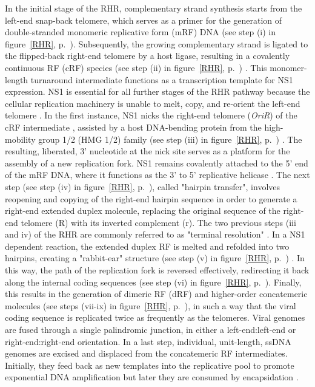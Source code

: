 In the initial stage of the RHR, complementary strand synthesis starts from the left-end snap-back telomere, which serves as a primer for the generation of double-stranded monomeric replicative form (mRF) DNA (see step (i) in figure~\ref{RHR}, p.~\pageref{RHR}). Subsequently, the growing complementary strand is ligated to the flipped-back right-end telomere by a host ligase, resulting in a covalently continuous RF (cRF) species (see step (ii) in figure~\ref{RHR}, p.~\pageref{RHR}) \cite{pmid2911112, pmid2543770}. This monomer-length turnaround intermediate functions as a transcription template for NS1 expression. NS1 is essential for all further stages of the RHR pathway because the cellular replication machinery is unable to melt, copy, and re-orient the left-end telomere \cite{pmid8995615}. In the first instance, NS1 nicks the right-end telomere (\textit{OriR}) of the cRF intermediate \cite{pmid9349487}, assisted by a host DNA-bending protein from the high-mobility group 1/2 (HMG 1/2) family (see step (iii) in figure~\ref{RHR}, p.~\pageref{RHR}) \cite{pmid9765384}. The resulting, liberated, 3' nucleotide at the nick site serves as a platform for the assembly of a new replication fork. NS1 remains covalently attached to the 5' end of the mRF DNA, where it functions as the 3' to 5' replicative helicase \cite{pmid12050365, pmid3339715, pmid3203742}. The next step (see step (iv) in figure~\ref{RHR}, p.~\pageref{RHR}), called "hairpin transfer", involves reopening and copying of the right-end hairpin sequence in order to generate a right-end extended duplex molecule, replacing the original sequence of the right-end telomere (R) with its inverted complement (r). The two previous steps (iii and iv) of the RHR are commonly referred to as "terminal resolution" \cite{telomere2}. In a NS1 dependent reaction, the extended duplex RF is melted and refolded into two hairpins, creating a "rabbit-ear" structure (see step (v) in figure~\ref{RHR}, p.~\pageref{RHR}) \cite{pmid14997524, pmid12075084}. In this way, the path of the replication fork is reversed effectively, redirecting it back along the internal coding sequences (see step (vi) in figure~\ref{RHR}, p.~\pageref{RHR}). Finally, this results in the generation of dimeric RF (dRF) and higher-order concatemeric molecules (see steps (vii-ix) in figure~\ref{RHR}, p.~\pageref{RHR}), in such a way that the viral coding sequence is replicated twice as frequently as the telomeres. Viral genomes are fused through a single palindromic junction, in either a left-end:left-end or right-end:right-end orientation. In a last step, individual, unit-length, ssDNA genomes are excised and displaced from the concatemeric RF intermediates. Initially, they feed back as new templates into the replicative pool to promote exponential DNA amplification but later they are consumed by encapsidation \cite{pmid15681430, encapsidation}.     

